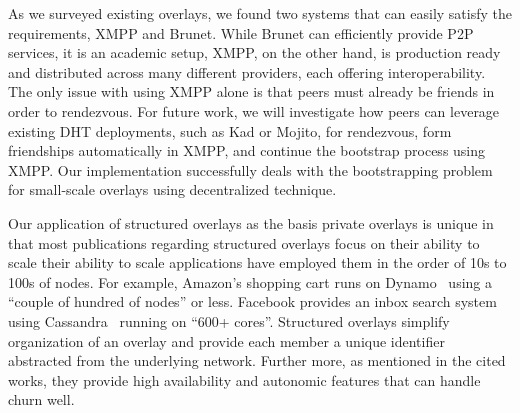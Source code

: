 \documentclass[conference]{IEEEtran}
\begin{document}
As we surveyed existing overlays, we found two systems that can easily satisfy
the requirements, XMPP and Brunet.  While Brunet can efficiently provide P2P
services, it is an academic setup, XMPP, on the other hand, is production ready
and distributed across many different providers, each offering
interoperability.  The only issue with using XMPP alone is that peers must
already be friends in order to rendezvous.  For future work, we will
investigate how peers can leverage existing DHT deployments, such as Kad or
Mojito, for rendezvous, form friendships automatically in XMPP, and continue
the bootstrap process using XMPP.  Our implementation successfully deals with
the bootstrapping problem for small-scale overlays using decentralized
technique.

Our application of structured overlays as the basis private overlays is unique
in that most publications regarding structured overlays focus on their ability
to scale their ability to scale applications have employed them in the order of
10s to 100s of nodes.  For example, Amazon's shopping cart runs on
Dynamo~\cite{dynamo} using a ``couple of hundred of nodes'' or less.  Facebook
provides an inbox search system using Cassandra~\cite{cassandra} running on
``600+ cores''.  Structured overlays simplify organization of an overlay and
provide each member a unique identifier abstracted from the underlying network.
Further more, as mentioned in the cited works, they provide high availability
and autonomic features that can handle churn well.




\suppressfloats
\end{document}
